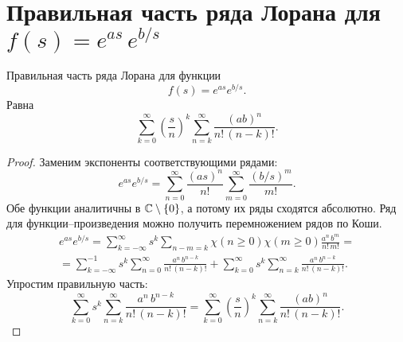 \section{Правильная часть ряда Лорана для $f(s) = e^{as}\,e^{b/s}$}
\begin{Th*}
Правильная часть ряда Лорана для функции
\[
    f(s) = e^{as}e^{b/s}
.\]
Равна
\[
    \sum_{k=0}^{\infty} \left(\frac{s}{n}\right)^k \sum_{n=k}^{\infty} \frac{(ab)^n}{n!\,(n-k)!}
.\]
\end{Th*}
\begin{proof}
Заменим экспоненты соответствующими рядами:
\[
    e^{as} e^{b/s} =
%
    \sum_{n=0}^{\infty} \frac{\left(as\right)^n}{n!}
    \sum_{m=0}^{\infty} \frac{\left(b/s\right)^m}{m!}
.\]
Обе функции аналитичны в $\mathbb{C} \setminus \{0\}$, а потому их ряды сходятся абсолютно. Ряд для функции--произведения можно получить перемножением рядов по Коши.
\begin{multline*}
    e^{as} e^{b/s} =
%
    \sum_{k=-\infty}^{\infty} s^k \sum_{n-m=k} \chi(n \ge 0) \chi(m \ge 0) \frac{a^n\,b^m}{n!\,m!}
=\\=
    \sum_{k=-\infty}^{-1} s^k \sum_{n=0}^{\infty} \frac{a^n\,b^{n-k}}{n!\,(n-k)!} +
    \sum_{k=0}^{\infty} s^k \sum_{n=k}^{\infty} \frac{a^n\,b^{n-k}}{n!\,(n-k)!}
.\end{multline*}
Упростим правильную часть:
\[
    \sum_{k=0}^{\infty} s^k \sum_{n=k}^{\infty} \frac{a^n\,b^{n-k}}{n!\,(n-k)!} =
    \sum_{k=0}^{\infty} \left(\frac{s}{n}\right)^k \sum_{n=k}^{\infty} \frac{(ab)^n}{n!\,(n-k)!}
.\]
\end{proof}
